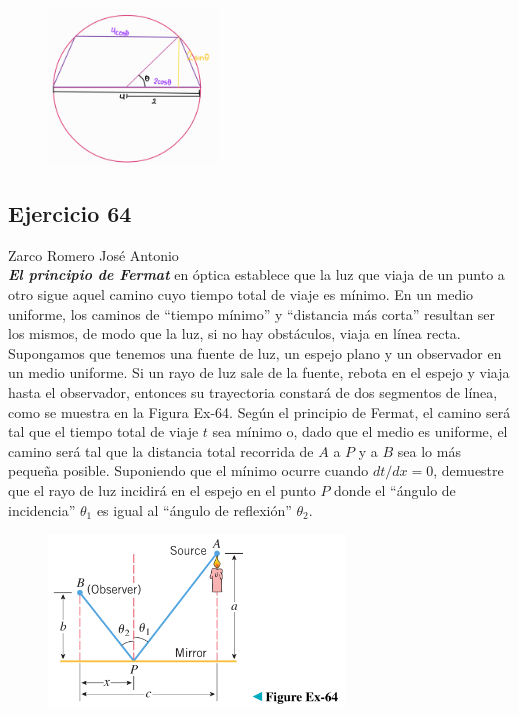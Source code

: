 \documentclass[12pt]{article}
\begin{document}
\begin{figure}[H]
\centering
\includegraphics[width=0.4\textwidth]{../img/img_Lista3/trapecio.png}
\end{figure}

\subsection{Ejercicio 64} Zarco Romero José Antonio \\

\textit{\textbf{El principio de Fermat}} en óptica establece que la luz que viaja de un punto a otro sigue aquel camino cuyo tiempo total de viaje es mínimo. En un medio uniforme, los caminos de ``tiempo mínimo'' y ``distancia más corta'' resultan ser los mismos, de modo que la luz, si no hay obstáculos, viaja en línea recta. Supongamos que tenemos una fuente de luz, un espejo plano y un observador en un medio uniforme. Si un rayo de luz sale de la fuente, rebota en el espejo y viaja hasta el observador, entonces su trayectoria constará de dos segmentos de línea, como se muestra en la Figura Ex-64. Según el principio de Fermat, el camino será tal que el tiempo total de viaje $t$ sea mínimo o, dado que el medio es uniforme, el camino será tal que la distancia total recorrida de $A$ a $P$ y a $B$ sea lo más pequeña posible. Suponiendo que el mínimo ocurre cuando $dt/dx = 0$, demuestre que el rayo de luz incidirá en el espejo en el punto $P$ donde el ``ángulo de incidencia'' $\theta_1$ es igual al ``ángulo de reflexión'' $\theta_2$.
\begin{figure}[H]
\centering
\includegraphics[width=0.7\textwidth]{../img/img_Lista3/3_64.png}
\end{figure}
\end{document}
